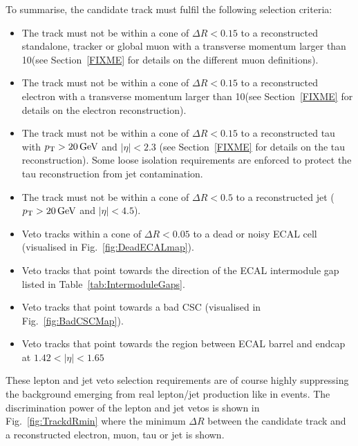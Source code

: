 To summarise, the candidate track must fulfil the following selection criteria:
\begin{itemize}
\renewcommand{\labelitemi}{\footnotesize{\ding{118}}}
\item The track must not be within a cone of $\Delta R<0.15$ to a reconstructed standalone, tracker or global muon with a transverse momentum larger than 10\gev (see Section~\ref{FIXME} for details on the different muon definitions).
\item The track must not be within a cone of $\Delta R<0.15$ to a reconstructed electron with a transverse momentum larger than 10\gev (see Section~\ref{FIXME} for details on the electron reconstruction).
\item The track must not be within a cone of $\Delta R<0.15$ to a reconstructed tau with $p_{\text{T}}>20\,\text{Ge}\kern-0.06667em\text{V}$ and $|\eta|<2.3$ (see Section~\ref{FIXME} for details on the tau reconstruction). 
      Some loose isolation requirements are enforced to protect the tau reconstruction from jet contamination.
\item The track must not be within a cone of $\Delta R< 0.5$ to a reconstructed jet ($p_{\text{T}}>20\,\text{Ge}\kern-0.06667em\text{V}$ and $|\eta|<4.5$).
\item Veto tracks within a cone of $\Delta R<0.05$ to a dead or noisy ECAL cell (visualised in Fig.~\ref{fig:DeadECALmap}).
\item Veto tracks that point towards the direction of the ECAL intermodule gap listed in Table~\ref{tab:IntermoduleGaps}.
\item Veto tracks that point towards a bad CSC (visualised in Fig.~\ref{fig:BadCSCMap}).
\item Veto tracks that point towards the region between ECAL barrel and endcap at $1.42<|\eta|<1.65$
\end{itemize}
These lepton and jet veto selection requirements are of course highly suppressing the background emerging from real lepton/jet production like in \WJets events.
The discrimination power of the lepton and jet vetos is shown in Fig.~\ref{fig:TrackdRmin} where the minimum $\Delta R$ between the candidate track and a reconstructed electron, muon, tau or jet is shown.\\

